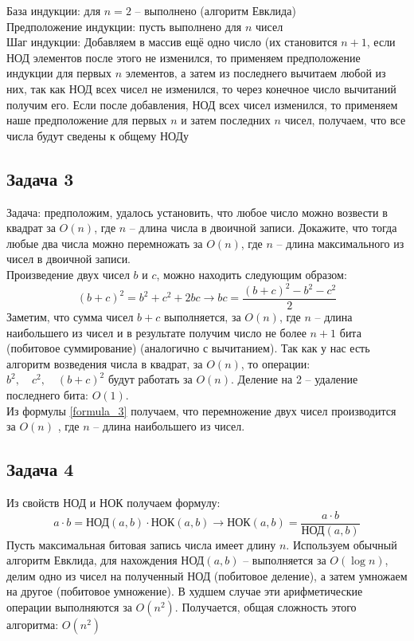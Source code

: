 \documentclass[a4paper,12pt]{article} %
\begin{document}
База индукции: для $ n = 2 $ -- выполнено (алгоритм Евклида)\\

Предположение индукции: пусть выполнено для $ n $ чисел\\

Шаг индукции: Добавляем в массив ещё одно число (их становится $ n+1 $, если НОД элементов после этого не изменился, то применяем предположение индукции для первых $ n $ элементов, а затем из последнего вычитаем любой из них, так как НОД всех чисел не изменился, то через конечное число вычитаний получим его. Если после добавления, НОД всех чисел изменился, то применяем наше предположение для первых $ n $ и затем последних $ n $ чисел, получаем, что все числа будут сведены к общему НОДу\\



\subsection*{Задача 3}
Задача: предположим, удалось установить, что любое число можно возвести в квадрат за $O(n)$, где $n$ -- длина числа в двоичной записи. Докажите, что тогда любые два числа можно перемножать за $O(n)$, где $n$ -- длина максимального из чисел в двоичной записи.\\

Произведение двух чисел $ b $ и $ c $, можно находить следующим образом:
\begin{equation} \label{formula_3}
(b+c)^{2}=b^{2}+c^{2}+2 b c \rightarrow b c=\frac{(b+c)^{2}-b^{2}-c^{2}}{2}
\end{equation}
Заметим, что сумма чисел $ b+c $ выполняется, за $O(n)$, где $ n $ -- длина наибольшего из чисел и в результате получим число не более $ n+1 $ бита (побитовое суммирование) (аналогично с вычитанием). Так как у нас есть алгоритм возведения числа в квадрат, за $O(n)$, то операции: $b^{2}, \quad c^{2}, \quad (b+c)^{2}$ будут работать за $O(n)$. Деление на 2 -- удаление последнего бита: $O(1)$. \\
Из формулы \eqref{formula_3} получаем, что перемножение двух чисел производится за $O(n)$ , где $ n $ -- длина наибольшего из чисел.


\subsection*{Задача 4}
Из свойств НОД и НОК получаем формулу: 
$$
a \cdot b = \text{НОД}(a,b) \cdot \text{НОК}(a,b) \longrightarrow 
\text{НОК}(a,b) = \frac{a \cdot b}{\text{НОД}(a,b)}  
$$
Пусть максимальная битовая запись числа имеет длину $ n $. Используем обычный алгоритм Евклида, для нахождения $ \text{НОД}(a,b) $ -- выполняется за $ O(\log n) $, делим одно из чисел на полученный НОД (побитовое деление), а затем умножаем на другое (побитовое умножение). В худшем случае эти арифметические операции выполняются за $ O(n^2) $. Получается, общая сложность этого алгоритма: $ O(n^2) $
\end{document}
